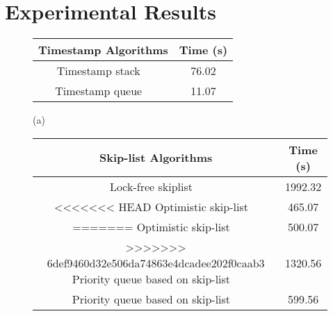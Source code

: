 \section{Experimental Results}
\label{section:experiments}
\newcommand{\emm}{(emm)}
\begin{figure}[]
\center



\begin{tabular}{|c | c | }
  \hline
   \textsf{\textbf{{Timestamp Algorithms}}} &  \textsf{\textbf{{Time (s)}}} \\
\hline
\hline
\textsf{Timestamp stack  ~\cite{MS:QueueAlgorithms}}\;\;\;\;\;\;  & \textsf{76.02} \\
\hline
\textsf{Timestamp queue  ~\cite{MS:QueueAlgorithms}}& \textsf{11.07} \\
\hline
\end{tabular}

\vspace*{0.1cm}

(a)
\\
\vspace*{0.5cm}

\begin{tabular}{|c | c | }
  \hline
   \textsf{\textbf{{Skip-list Algorithms}}} &  \textsf{\textbf{{Time (s)}}} \\
\hline
\hline
\;\;\;\;\textsf{Lock-free skiplist   ~\cite{ArtOfMpP}}\;\;\;\;\;\;  & \textsf{1992.32} \\
\hline
<<<<<<< HEAD
\textsf{Optimistic skip-list  ~\cite{MS:QueueAlgorithms}}& \textsf{465.07} \\
=======
\textsf{Optimistic skip-list  ~\cite{MS:QueueAlgorithms}}& \textsf{500.07} \\
>>>>>>> 6def9460d32e506da74863e4dcadee202f0caab3
\hline 
\textsf{Priority queue based on skip-list  ~\cite{Shavit:ElimQueue}}  &  \textsf{1320.56} \\
\hline
\textsf{Priority queue based on skip-list  ~\cite{Shavit:ElimQueue}}  &  \textsf{599.56} \\
\hline
\end{tabular}

\vspace*{0.1cm}


\end{figure}
